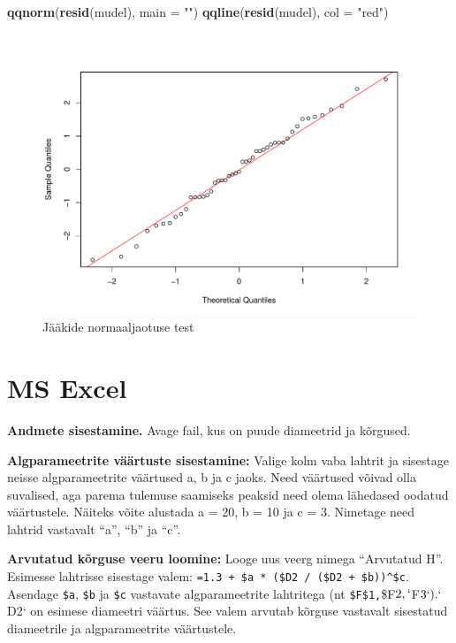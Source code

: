 \documentclass[
]{book}
\newenvironment{Shaded}{\begin{snugshade}}{\end{snugshade}}
\newcommand{\AttributeTok}[1]{\textcolor[rgb]{0.13,0.29,0.53}{#1}}
\newcommand{\FunctionTok}[1]{\textcolor[rgb]{0.13,0.29,0.53}{\textbf{#1}}}
\newcommand{\NormalTok}[1]{#1}
\newcommand{\StringTok}[1]{\textcolor[rgb]{0.31,0.60,0.02}{#1}}
\renewenvironment{Shaded} {\begin{snugshade}\footnotesize} {\end{snugshade}}
\begin{document}
\begin{Shaded}
\begin{Highlighting}[]
\FunctionTok{qqnorm}\NormalTok{(}\FunctionTok{resid}\NormalTok{(mudel), }\AttributeTok{main =} \StringTok{""}\NormalTok{)}
\FunctionTok{qqline}\NormalTok{(}\FunctionTok{resid}\NormalTok{(mudel), }\AttributeTok{col =} \StringTok{"red"}\NormalTok{)}
\end{Highlighting}
\end{Shaded}

\begin{figure}[!ht]
\includegraphics[width=0.8\linewidth]{_main_files/figure-latex/unnamed-chunk-81-1} \caption{Jääkide normaaljaotuse test}\label{fig:unnamed-chunk-81}
\end{figure}

\clearpage

\section{MS Excel}\label{ms-excel-1}

\textbf{Andmete sisestamine.} Avage fail, kus on puude diameetrid ja kõrgused.

\textbf{Algparameetrite väärtuste sisestamine:} Valige kolm vaba lahtrit ja sisestage neisse algparameetrite väärtused a, b ja c jaoks. Need väärtused võivad olla suvalised, aga parema tulemuse saamiseks peaksid need olema lähedased oodatud väärtustele. Näiteks võite alustada a = 20, b = 10 ja c = 3. Nimetage need lahtrid vastavalt ``a'', ``b'' ja ``c''.

\textbf{Arvutatud kõrguse veeru loomine:} Looge uus veerg nimega ``Arvutatud H''. Esimesse lahtrisse sisestage valem: \texttt{=1.3\ +\ \$a\ *\ (\$D2\ /\ (\$D2\ +\ \$b))\^{}\$c}. Asendage \texttt{\$a}, \texttt{\$b} ja \texttt{\$c} vastavate algparameetrite lahtritega (nt \texttt{\$F\$1,}\$F\(2, `\)F\(3`). `\)D2` on esimese diameetri väärtus. See valem arvutab kõrguse vastavalt sisestatud diameetrile ja algparameetrite väärtustele.
\end{document}
